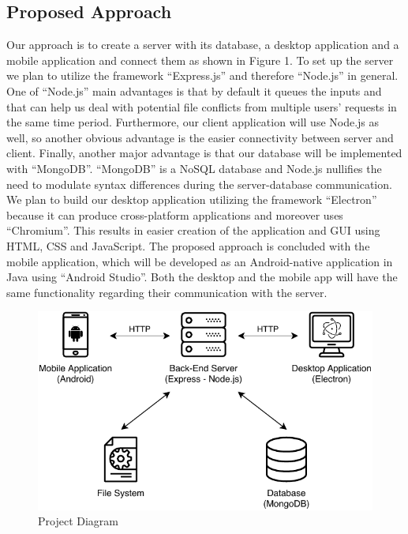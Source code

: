 \documentclass[11pt]{article}
\begin{document}
\subsection{Proposed Approach}
Our approach is to create a server with its database, a desktop application and a mobile application and connect them as shown in Figure 1. 
To set up the server we plan to utilize the framework “Express.js” and therefore “Node.js” in general. One of “Node.js” main advantages is that by default it queues the inputs and that can help us deal with potential file conflicts from multiple users’ requests in the same time period. Furthermore, our client application will use Node.js as well, so another obvious advantage is the easier connectivity between server and client. Finally, another major advantage is that our database will be implemented with “MongoDB”. “MongoDB” is a NoSQL database and Node.js nullifies the need to modulate syntax differences during the server-database communication. We plan to build our desktop application utilizing the framework “Electron” because it can produce cross-platform applications and moreover uses “Chromium”. This results in easier creation of the application and GUI using HTML, CSS and JavaScript. The proposed approach is concluded with the mobile application, which will be developed as an Android-native application in Java using “Android Studio”. Both the desktop and the mobile app will have the same functionality regarding their communication with the server.

\begin{figure}[h]
	\centering
	\includegraphics[scale=1.0]{graphics/ProjectDiagram.pdf}
	\caption{Project Diagram}
\end{figure}
\end{document}
